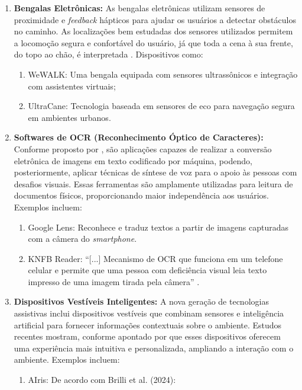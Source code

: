 \begin{enumerate}
\begin{enumerate}
        \end{enumerate}
    \item \textbf{Bengalas Eletrônicas:} As bengalas eletrônicas utilizam sensores de proximidade e \textit{feedback} hápticos para ajudar os usuários a detectar obstáculos no caminho. As localizações bem estudadas dos sensores utilizados permitem a locomoção segura e confortável do usuário, já que toda a cena à sua frente, do topo ao chão, é interpretada \cite{AmmarBouhamed2012}. Dispositivos como:
        \begin{enumerate}
            \item WeWALK: Uma bengala equipada com sensores ultrassônicos e integração com assistentes virtuais;
            \item UltraCane: Tecnologia baseada em sensores de eco para navegação segura em ambientes urbanos.
        \end{enumerate}
    \item \textbf{Softwares de OCR (Reconhecimento Óptico de Caracteres):} Conforme proposto por , são aplicações capazes de realizar a conversão eletrônica de imagens em texto codificado por máquina, podendo, posteriormente, aplicar técnicas de síntese de voz para o apoio às pessoas com desafios visuais. Essas ferramentas são amplamente utilizadas para leitura de documentos físicos, proporcionando maior independência aos usuários. Exemplos incluem:
        \begin{enumerate}
            \item Google Lens: Reconhece e traduz textos a partir de imagens capturadas com a câmera do \textit{smartphone}.
            \item KNFB Reader: “[...] Mecanismo de OCR que funciona em um telefone celular e permite que uma pessoa com deficiência visual leia texto impresso de uma imagem tirada pela câmera” \cite{wang2010}.
        \end{enumerate}
    \item \textbf{Dispositivos Vestíveis Inteligentes:} A nova geração de tecnologias assistivas inclui dispositivos vestíveis que combinam sensores e inteligência artificial para fornecer informações contextuais sobre o ambiente. Estudos recentes mostram, conforme apontado por  que esses dispositivos oferecem uma experiência mais intuitiva e personalizada, ampliando a interação com o ambiente. Exemplos incluem:
        \begin{enumerate}
            \item AIris: De acordo com Brilli et al. (2024):

\end{enumerate}
\end{enumerate}
